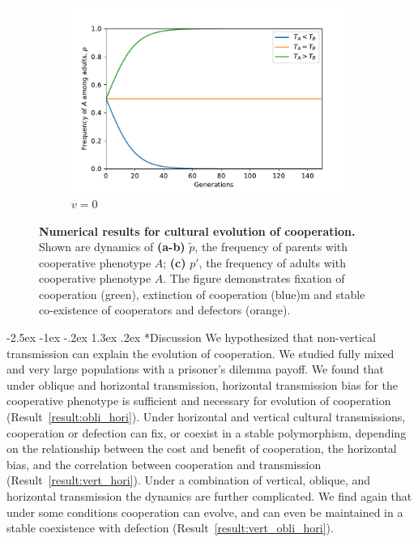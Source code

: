 \documentclass[12pt]{extarticle}
\makeatletter
\renewcommand\section{\@startsection {section}{1}{\z@}%
     {-2.5ex \@plus -1ex \@minus -.2ex}%
     {1.3ex \@plus.2ex}%
    {\Large\bfseries}}
\makeatother
\begin{document}
{\begin{figure}[H]
\begin{subfigure}{8cm}
    \includegraphics[scale=0.5]{figure3c.pdf}
    \caption{$v=0$}
    \label{fig:results_c}
  \end{subfigure}
  \label{fig:results}
  \caption{
  \textbf{Numerical results for cultural evolution of cooperation.}
  Shown are dynamics of \textbf{(a-b)} $\tilde{p}$, the frequency of parents with cooperative phenotype $A$; \textbf{(c)} $p'$, the frequency of adults with cooperative phenotype $A$.
  The figure demonstrates fixation of cooperation (green), extinction of cooperation (blue)m and stable co-existence of cooperators and defectors (orange).
  }
\end{figure}


\section*{Discussion}
We hypothesized that non-vertical transmission can explain the evolution of cooperation.
We studied fully mixed and very large populations with a prisoner's dilemma payoff. 
We found that under oblique and horizontal transmission, horizontal transmission bias for the cooperative phenotype is sufficient and necessary for evolution of cooperation (Result~\autoref{result:obli_hori}).
Under horizontal and vertical cultural transmissions, cooperation or defection can fix, or coexist in a stable polymorphism, depending on the relationship between the cost and benefit of cooperation, the horizontal bias, and the correlation between cooperation and transmission (Result~\autoref{result:vert_hori}).
Under a combination of vertical, oblique, and horizontal transmission the dynamics are further complicated. We find again that under some conditions cooperation can evolve, and can even be maintained in a stable coexistence with defection (Result~\autoref{result:vert_obli_hori}).

}
\end{document}
